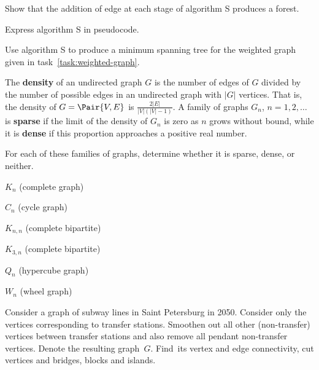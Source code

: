 \documentclass[a4paper,12pt]{article}
\begin{document}
\begin{tasks}
    \begin{subtasks}
        \item Show that the addition of edge at each stage of algorithm S produces a forest.
        \item Express algorithm S in pseudocode.
        \item Use algorithm S to produce a minimum spanning tree for the weighted graph given in task~\ref{task:weighted-graph}.
    \end{subtasks}


    \item The \textbf{density} of an undirected graph $G$ is the number of edges
    of $G$ divided by the number of possible edges in an undirected
    graph with $|G|$ vertices.
    That is, the density of $G = \Pair{V, E}$ is $\frac{2 |E|}{|V| (|V| - 1)}$.
    A family of graphs $G_n$, $n = 1, 2, \dots$ is \textbf{sparse} if the limit of the density of $G_n$ is zero as $n$ grows without bound, while it is \textbf{dense} if this proportion approaches a positive real number.

    For each of these families of graphs, determine whether it is sparse, dense, or neither.

    \begin{multicols}{3}
    \begin{subtasks}
        \item $K_n$ (complete graph)
        \item $C_n$ (cycle graph)
        \item $K_{n,n}$ (complete bipartite)
        \item $K_{3,n}$ (complete bipartite)
        \item $Q_n$ (hypercube graph)
        \item $W_n$ (wheel graph)
    \end{subtasks}
    \end{multicols}


    \item Consider a graph of subway lines in Saint Petersburg in 2050.
    Consider only the vertices corresponding to transfer stations.
    Smoothen out all other (non-transfer) vertices between transfer stations and also remove all pendant non-transfer vertices.
    Denote the resulting graph~$G$.
    Find~its vertex and edge connectivity, cut vertices and bridges, blocks and islands.



\end{tasks}
\end{document}

